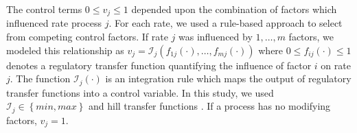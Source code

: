 \documentclass[11pt,letterpaper]{article}
\begin{document}

The control terms $0\leq v_{j}\leq 1$ depended upon the combination of factors which influenced rate process $j$.
For each rate, we used a rule-based approach to select from competing control factors.
If rate $j$ was influenced by $1,\dots,m$ factors, we modeled this relationship as
$v_{j}=\mathcal{I}_{j}\left(f_{1j}\left(\cdot\right),\hdots,f_{mj}\left(\cdot\right)\right)$
where $0\leq f_{ij}\left(\cdot\right)\leq 1$ denotes a regulatory transfer function quantifying the influence of factor $i$ on rate $j$.
The function $\mathcal{I}_{j}\left(\cdot\right)$ is an integration rule which maps the output of regulatory transfer functions into a control
variable. In this study, we used $\mathcal{I}_{j}\in\left\{min,max\right\}$ and hill transfer functions \cite{pr3010178,pr3010138}.
If a process has no modifying factors, $v_{j}=1$.

\end{document}
